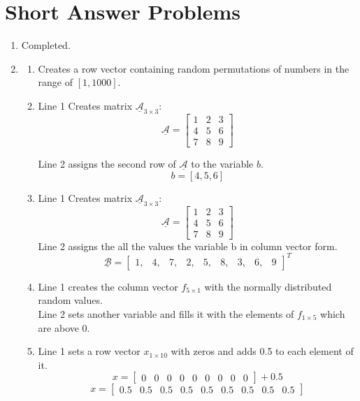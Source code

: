 \documentclass{article}
\newcommand\mat[1]{\mathcal{\underline{#1}}}
\begin{document}
\section{Short Answer Problems}
	\begin{enumerate}
		\item Completed.
		
		\item 
			\begin{enumerate}
				\item Creates a row vector containing random permutations of numbers in the
				range of  $[1, 1000]$.
				
				\item Line 1 Creates matrix $\mat{A}_{3\times3}$:
				$$\mat{A}= \begin{bmatrix}1 & 2 & 3 \\ 4 & 5 & 6 \\7 & 8 & 9\end{bmatrix}$$
				
				Line 2 assigns the second row of $\mat{A}$ to the variable $b$.
				$$b = [4,5,6]$$

				\item Line 1 Creates matrix $\mat{A}_{3\times3}$:
				$$\mat{A}= \begin{bmatrix}1 & 2 & 3 \\ 4 & 5 & 6 \\7 & 8 & 9\end{bmatrix}$$
				Line 2 assigns the all the values the variable b in column vector form.
				$$\mat{B}= \begin{bmatrix}1, & 4, & 7, & 2, & 5, & 8, & 3, & 6, & 9
				\end{bmatrix}^T$$

				\item Line 1 creates the column vector $f_{5\times1}$ with the normally
				distributed random values. \\
				Line 2 sets another variable and fills it with the elements of
				$f_{1\times5}$ which are above 0. 

				\item Line 1 sets a row vector  $x_{1\times10}$ with zeros and adds 0.5 to
				each element of it.
				$$x = \begin{bmatrix}0 & 0 & 0 & 0 & 0 & 0 & 0 & 0 & 0 \end{bmatrix}+0.5$$
				$$x = \begin{bmatrix}0.5 & 0.5 & 0.5 & 0.5 & 0.5 & 0.5 & 0.5 & 0.5 & 0.5\end{bmatrix}$$
					

\end{enumerate}
\end{enumerate}
\end{document}
